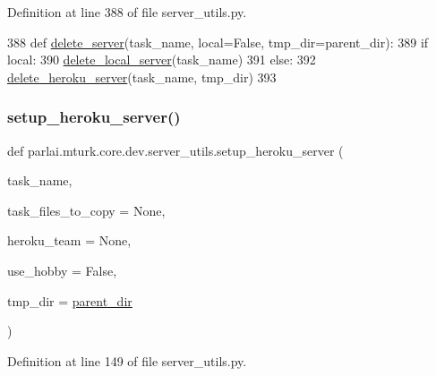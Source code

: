 Definition at line 388 of file server\+\_\+utils.\+py.


\begin{DoxyCode}
388 \textcolor{keyword}{def }\hyperlink{namespaceparlai_1_1mturk_1_1core_1_1server__utils_a3c7c1d82bd4d26eb98ce9711de3cca7c}{delete\_server}(task\_name, local=False, tmp\_dir=parent\_dir):
389     \textcolor{keywordflow}{if} local:
390         \hyperlink{namespaceparlai_1_1mturk_1_1core_1_1server__utils_a9b4f4c3f696be001c2fa96b3690af83c}{delete\_local\_server}(task\_name)
391     \textcolor{keywordflow}{else}:
392         \hyperlink{namespaceparlai_1_1mturk_1_1core_1_1server__utils_a8dfde882f9d6ff492ca565ae2334fc70}{delete\_heroku\_server}(task\_name, tmp\_dir)
393 \end{DoxyCode}
\mbox{\label{namespaceparlai_1_1mturk_1_1core_1_1dev_1_1server__utils_a138743e96f495bce1535782ffa0f38bf}} 
\subsubsection{\texorpdfstring{setup\+\_\+heroku\+\_\+server()}{setup\_heroku\_server()}}
{\footnotesize\ttfamily def parlai.\+mturk.\+core.\+dev.\+server\+\_\+utils.\+setup\+\_\+heroku\+\_\+server (\begin{DoxyParamCaption}\item[{}]{task\+\_\+name,  }\item[{}]{task\+\_\+files\+\_\+to\+\_\+copy = {\ttfamily None},  }\item[{}]{heroku\+\_\+team = {\ttfamily None},  }\item[{}]{use\+\_\+hobby = {\ttfamily False},  }\item[{}]{tmp\+\_\+dir = {\ttfamily \hyperlink{namespaceparlai_1_1mturk_1_1core_1_1dev_1_1server__utils_a432ae14c0d872fbfebe4d9b7d73d13b9}{parent\+\_\+dir}} }\end{DoxyParamCaption})}



Definition at line 149 of file server\+\_\+utils.\+py.


